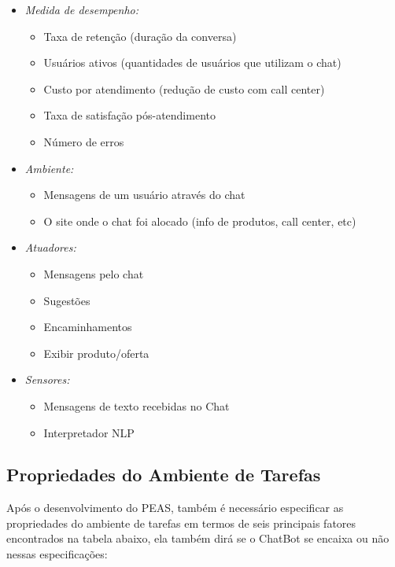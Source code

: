\begin{itemize}
   \item \textit{Medida de desempenho:}
         \begin{itemize}
            \item Taxa de retenção (duração da conversa)
            \item Usuários ativos (quantidades de usuários que utilizam o chat)
            \item Custo por atendimento (redução de custo com call center)
            \item Taxa de satisfação pós-atendimento
            \item Número de erros

         \end{itemize}
   \item \textit{Ambiente:}
         \begin{itemize}
            \item Mensagens de um usuário através do chat
            \item O site onde o chat foi alocado (info de produtos, call center, etc)

         \end{itemize}
   \item \textit{Atuadores:}
         \begin{itemize}
            \item Mensagens pelo chat
            \item Sugestões
            \item Encaminhamentos
            \item Exibir produto/oferta

         \end{itemize}
   \item \textit{Sensores:}
         \begin{itemize}
            \item Mensagens de texto recebidas no Chat
            \item Interpretador NLP

         \end{itemize}

\end{itemize}
\subsection[Propriedades do Ambiente de Tarefas]{Propriedades do Ambiente de Tarefas}
Após o desenvolvimento do PEAS, também é necessário especificar as propriedades do ambiente de tarefas em termos de seis principais fatores encontrados na tabela abaixo, ela também dirá se o ChatBot se encaixa ou não nessas especificações:

